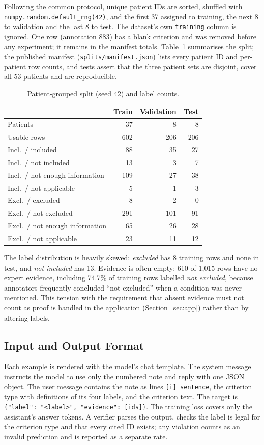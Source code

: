 \documentclass[conference]{IEEEtran}
\newcommand{\code}[1]{\texttt{\small #1}}
\begin{document}
Following the common protocol, unique patient IDs are sorted, shuffled with \code{numpy.random.default\_rng(42)}, and the first 37 assigned to training, the next 8 to validation and the last 8 to test. The dataset's own \code{training} column is ignored. One row (annotation 883) has a blank criterion and was removed before any experiment; it remains in the manifest totals. Table~\ref{tab:split} summarises the split; the published manifest (\code{splits/manifest.json}) lists every patient ID and per-patient row counts, and tests assert that the three patient sets are disjoint, cover all 53 patients and are reproducible.

\begin{table}[t]
\centering
\caption{Patient-grouped split (seed 42) and label counts.}
\label{tab:split}
\setlength{\tabcolsep}{4pt}
\begin{tabular}{lrrr}
\toprule
 & Train & Validation & Test \\
\midrule
Patients & 37 & 8 & 8 \\
Usable rows & 602 & 206 & 206 \\
\midrule
Incl.\ / included & 88 & 35 & 27 \\
Incl.\ / not included & 13 & 3 & 7 \\
Incl.\ / not enough information & 109 & 27 & 38 \\
Incl.\ / not applicable & 5 & 1 & 3 \\
Excl.\ / excluded & 8 & 2 & 0 \\
Excl.\ / not excluded & 291 & 101 & 91 \\
Excl.\ / not enough information & 65 & 26 & 28 \\
Excl.\ / not applicable & 23 & 11 & 12 \\
\bottomrule
\end{tabular}
\end{table}

The label distribution is heavily skewed: \emph{excluded} has 8 training rows and none in test, and \emph{not included} has 13. Evidence is often empty: 610 of 1{,}015 rows have no expert evidence, including 74.7\% of training rows labelled \emph{not excluded}, because annotators frequently concluded ``not excluded'' when a condition was never mentioned. This tension with the requirement that absent evidence must not count as proof is handled in the application (Section~\ref{sec:app}) rather than by altering labels.

\subsection{Input and Output Format}
Each example is rendered with the model's chat template. The system message instructs the model to use only the numbered note and reply with one JSON object. The user message contains the note as lines \code{[i] sentence}, the criterion type with definitions of its four labels, and the criterion text. The target is \code{\{"label": "<label>", "evidence": [ids]\}}. The training loss covers only the assistant's answer tokens. A verifier parses the output, checks the label is legal for the criterion type and that every cited ID exists; any violation counts as an invalid prediction and is reported as a separate rate.
\end{document}
